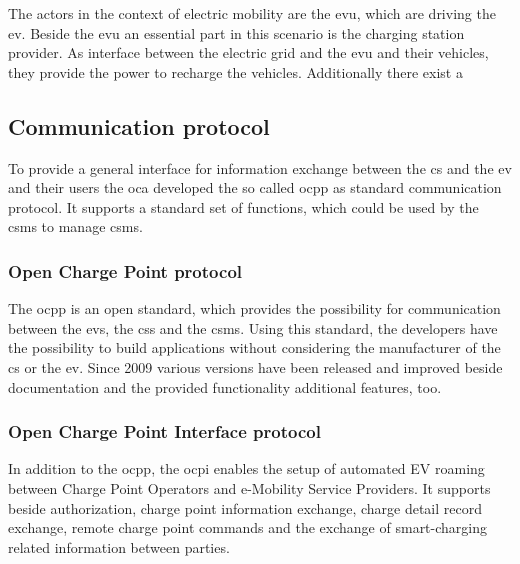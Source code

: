 The actors in the context of electric mobility are the \acrfull{evu}, which are driving the \acrfull{ev}. Beside the \acrshort{evu} an essential part in this scenario is the charging station provider. As interface between the electric grid and the \acrshort{evu} and their vehicles, they provide the power to recharge the vehicles.
Additionally there exist a 

\subsection{Communication protocol}
\label{ch:Introduction:sec:Electric Mobility:ssec:Communication protocol}

To provide a general interface for information exchange between the \acrfull{cs} and the \acrfull{ev} and their users the \acrfull{oca} developed the so called \acrfull{ocpp} as standard communication protocol. It supports a standard set of functions, which could be used by the \acrfull{csms} to manage \acrshort{csms}.

\subsubsection{Open Charge Point protocol}
\label{ch:Introduction:sec:Electric Mobility:ssec:Communication protocol:sssec:Open Charge Point Protocol}

The \acrfull{ocpp} is an open standard, which provides the possibility for communication between the \acrshort{ev}s, the \acrshort{cs}s and the \acrfull{csms}. Using this standard, the developers have the possibility to build applications without considering the manufacturer of the \acrshort{cs} or the \acrshort{ev}. Since 2009 various versions have been released and improved beside documentation and the provided functionality additional features, too.  \cite{raboaca_overview_2022}

\subsubsection{Open Charge Point Interface protocol}
\label{ch:Introduction:sec:Electric Mobility:ssec:Communication protocol:sssec:Open Charge Interface Protocol}

In addition to the \acrfull{ocpp}, the \acrfull{ocpi} enables the setup of automated EV roaming between Charge Point Operators and e-Mobility Service Providers. It supports beside authorization, charge point information exchange, charge detail record exchange, remote charge point commands and the exchange of smart-charging related information between parties.

